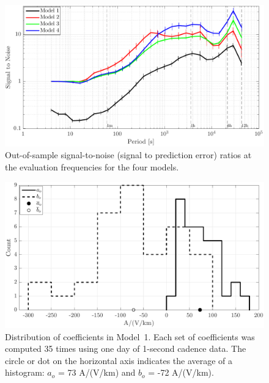 \documentclass[draft,linenumbers]{agujournal2018}
\begin{document}
\begin{figure}[h]
  \centering
  \includegraphics[width=\textwidth]{figures/plot_model_summary_SN-options-1-v0-o0.pdf}
  \caption{Out-of-sample signal-to-noise (signal to prediction error) ratios at the evaluation frequencies for the four models.}
  \label{SN}
\end{figure}

\begin{figure}[h]
  \centering
  \includegraphics[width=\textwidth]{figures/plot_model_summary_aobo_histograms-options-1-v0-o0.pdf}
  \caption{Distribution of coefficients in Model~1. Each set of coefficients was computed 35 times using one day of 1-second cadence data. The circle or dot on the horizontal axis indicates the average of a histogram: $a_o$ = 73 A/(V/km) and $b_o$ = -72 A/(V/km).}
  \label{histogram}
\end{figure}
\end{document}
